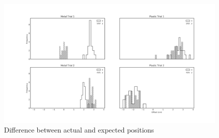 \documentclass{article}
\begin{document}
\\\\
\begin{figure}
\begin{center}
\includegraphics[width=1\textwidth]{hist_300.png} %
    \caption{Difference between actual and expected positions}
    \label{fig:hist}
\end{center}
\end{figure}
\clearpage
\end{document}
